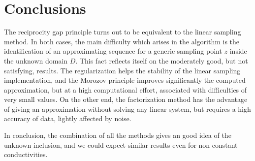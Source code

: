 \documentclass[10pt, a4paper, twoside, openright]{book}
\theoremstyle{definition}
\theoremstyle{plain}
\theoremstyle{plain}
\theoremstyle{plain}
\theoremstyle{plain}
\theoremstyle{plain}
\theoremstyle{plain}
\theoremstyle{plain}
\theoremstyle{plain}
\begin{document}
\clearpage

\chapter*{Conclusions}
The reciprocity gap principle turns out to be equivalent to the linear sampling method.
In both cases, the main difficulty which arises in the algorithm is the identification of an approximating
sequence for a generic sampling point $z$ inside the unknown domain $D$. This fact reflects itself 
on the moderately good, but not satisfying, results.
The regularization helps the stability of the linear sampling implementation, and 
the Morozov principle improves significantly the computed approximation, but at a high 
computational effort, associated with difficulties of very small values.
On the other end, the factorization method has the advantage of giving an approximation 
without solving any linear system, but requires a high accuracy of data, lightly affected 
by noise.

In conclusion, the combination of all the methods gives an good idea of the unknown 
inclusion, and we could expect similar results even for non constant conductivities.

\printbibliography %
\end{document}
